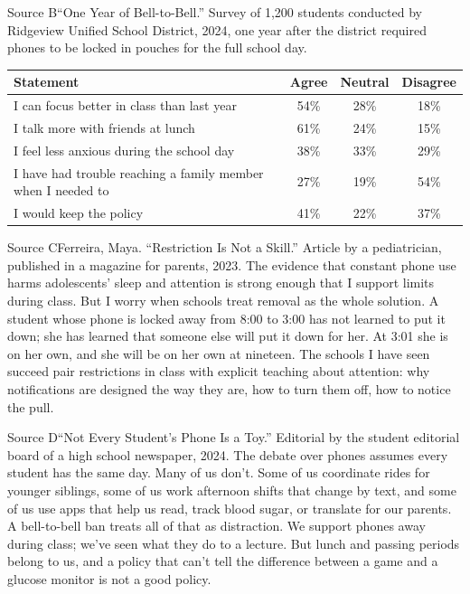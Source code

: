 \documentclass[11pt]{article}
\begin{document}
\begin{source}{Source B}{``One Year of Bell-to-Bell.'' Survey of 1,200 students conducted by Ridgeview Unified School District, 2024, one year after the district required phones to be locked in pouches for the full school day.}
\begin{center}\small
\begin{tabular}{lccc}
\toprule
Statement & Agree & Neutral & Disagree \\
\midrule
I can focus better in class than last year & 54\% & 28\% & 18\% \\
I talk more with friends at lunch & 61\% & 24\% & 15\% \\
I feel less anxious during the school day & 38\% & 33\% & 29\% \\
I have had trouble reaching a family member when I needed to & 27\% & 19\% & 54\% \\
I would keep the policy & 41\% & 22\% & 37\% \\
\bottomrule
\end{tabular}
\end{center}
\end{source}

\begin{source}{Source C}{Ferreira, Maya. ``Restriction Is Not a Skill.'' Article by a pediatrician, published in a magazine for parents, 2023.}
The evidence that constant phone use harms adolescents' sleep and attention is strong enough that I support limits during class. But I worry when schools treat removal as the whole solution. A student whose phone is locked away from 8:00 to 3:00 has not learned to put it down; she has learned that someone else will put it down for her. At 3:01 she is on her own, and she will be on her own at nineteen. The schools I have seen succeed pair restrictions in class with explicit teaching about attention: why notifications are designed the way they are, how to turn them off, how to notice the pull.
\end{source}

\begin{source}{Source D}{``Not Every Student's Phone Is a Toy.'' Editorial by the student editorial board of a high school newspaper, 2024.}
The debate over phones assumes every student has the same day. Many of us don't. Some of us coordinate rides for younger siblings, some of us work afternoon shifts that change by text, and some of us use apps that help us read, track blood sugar, or translate for our parents. A bell-to-bell ban treats all of that as distraction. We support phones away during class; we've seen what they do to a lecture. But lunch and passing periods belong to us, and a policy that can't tell the difference between a game and a glucose monitor is not a good policy.
\end{source}
\end{document}
